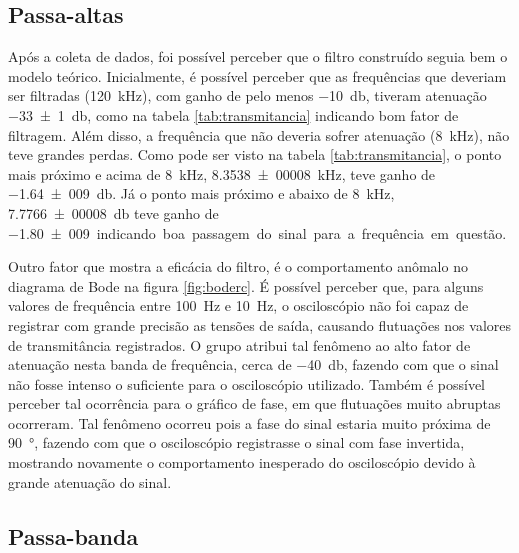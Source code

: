 \subsection{Passa-altas}

  Após a coleta de dados, foi possível perceber que o filtro construído seguia bem o modelo teórico. Inicialmente, é possível perceber que as frequências que deveriam ser filtradas (\SI{120}{\kilo\hertz}), com ganho de pelo menos \SI{-10}{\decibel}, tiveram atenuação \SI{-33(1)}{\decibel}, como na tabela \ref{tab:transmitancia} indicando bom fator de filtragem. Além disso, a frequência que não deveria sofrer atenuação (\SI{8}{\kilo\hertz}), não teve grandes perdas. Como pode ser visto na tabela \ref{tab:transmitancia}, o ponto mais próximo e acima de \SI{8}{\kilo\hertz}, \SI{8,3538(00008)}{\kilo\hertz}, teve ganho de \SI{-1,64(009)}{\decibel}. Já o ponto mais próximo e abaixo de \SI{8}{\kilo\hertz}, \SI{7,7766(00008)}{\decibel} teve ganho de \SI{-1,80(009)} indicando boa passagem do sinal para a frequência em questão.\par
  Outro fator que mostra a eficácia do filtro, é o comportamento anômalo no diagrama de Bode na figura \ref{fig:boderc}. É possível perceber que, para alguns valores de frequência entre \SI{100}{\hertz} e \SI{10}{\hertz}, o osciloscópio não foi capaz de registrar com grande precisão as tensões de saída, causando flutuações nos valores de transmitância registrados. O grupo atribui tal fenômeno ao alto fator de atenuação nesta banda de frequência, cerca de \SI{-40}{\decibel}, fazendo com que o sinal não fosse intenso o suficiente para o osciloscópio utilizado. Também é possível perceber tal ocorrência para o gráfico de fase, em que flutuações muito abruptas ocorreram. Tal fenômeno ocorreu pois a fase do sinal estaria muito próxima de \SI{90}{\degree}, fazendo com que o osciloscópio registrasse o sinal com fase invertida, mostrando novamente o comportamento inesperado do osciloscópio devido à grande atenuação do sinal.
  

  \subsection{Passa-banda}
  
  